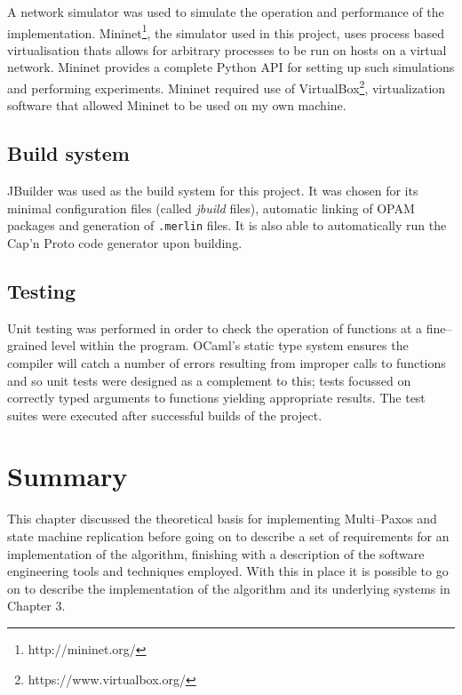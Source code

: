 A network simulator was used to simulate the operation and performance of the implementation. Mininet\footnote{http://mininet.org/}, the simulator used in this project, uses process based virtualisation thats allows for arbitrary processes to be run on hosts on a virtual network. Mininet provides a complete Python API for setting up such simulations and performing experiments. Mininet required use of VirtualBox\footnote{https://www.virtualbox.org/}, virtualization software that allowed Mininet to be used on my own machine.

\subsection{Build system}
JBuilder was used as the build system for this project. It was chosen for its minimal configuration files (called \emph{jbuild} files), automatic linking of OPAM packages and generation of \texttt{.merlin} files. It is also able to automatically run the Cap'n Proto code generator upon building.

\subsection{Testing}
\label{subsection-testing}
Unit testing was performed in order to check the operation of functions at a fine--grained level within the program. OCaml's static type system ensures the compiler will catch a number of errors resulting from improper calls to functions and so unit tests were designed as a complement to this; tests focussed on correctly typed arguments to functions yielding appropriate results. The test suites were executed after successful builds of the project.

\section{Summary}
This chapter discussed the theoretical basis for implementing Multi--Paxos and state machine replication before going on to describe a set of requirements for an implementation of the algorithm, finishing with a description of the software engineering tools and techniques employed. With this in place it is possible to go on to describe the implementation of the algorithm and its underlying systems in Chapter 3.




